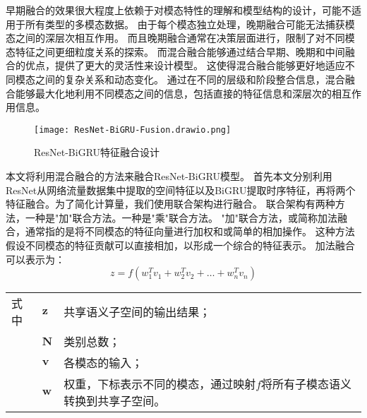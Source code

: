 早期融合的效果很大程度上依赖于对模态特性的理解和模型结构的设计，可能不适用于所有类型的多模态数据。
由于每个模态独立处理，晚期融合可能无法捕获模态之间的深层次相互作用。
而且晚期融合通常在决策层面进行，限制了对不同模态特征之间更细粒度关系的探索。
而混合融合能够通过结合早期、晚期和中间融合的优点，提供了更大的灵活性来设计模型。
这使得混合融合能够更好地适应不同模态之间的复杂关系和动态变化。
通过在不同的层级和阶段整合信息，混合融合能够最大化地利用不同模态之间的信息，包括直接的特征信息和深层次的相互作用信息。\par

\begin{figure}[htbp]
  \centering
  \texttt{[image: ResNet-BiGRU-Fusion.drawio.png]}
  \caption{ResNet-BiGRU特征融合设计}
  \label{fig:ResNet-BiGRU-Fusion}
\end{figure}

本文将利用混合融合的方法来融合ResNet-BiGRU模型。
首先本文分别利用ResNet从网络流量数据集中提取的空间特征以及BiGRU提取时序特征，再将两个特征融合。为了简化计算量，我们使用联合架构进行融合。
联合架构有两种方法，一种是"加"联合方法。一种是"乘"联合方法。
"加"联合方法，或简称加法融合，通常指的是将不同模态的特征向量进行加权和或简单的相加操作。
这种方法假设不同模态的特征贡献可以直接相加，以形成一个综合的特征表示。
加法融合可以表示为：
\begin{equation}
  z = f(w_1^Tv_1 + w_2^Tv_2+ \dots + w_n^Tv_n)
\end{equation}
\begin{flushleft}
  \renewcommand\arraystretch{1.25}
  \begin{tabularx}{\textwidth}{@{}>{\normalsize\rm}l@{\quad}>{\normalsize\rm}l@{——}>{\normalsize\rm}X@{}}
  式中& $\symbf{z}$ &共享语义子空间的输出结果；\\
  &  $\symbf{N}$&类别总数；\\
  &  $\symbf{v}$ &各模态的输入；\\
  &  $\symbf{w}$ & 权重，下标表示不同的模态，通过映射$f$将所有子模态语义转换到共享子空间。\\
  \end{tabularx}\vspace{.5ex}%
  \end{flushleft}


